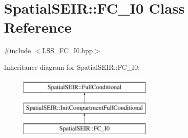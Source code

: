 \hypertarget{classSpatialSEIR_1_1FC__I0}{\section{Spatial\-S\-E\-I\-R\-:\-:F\-C\-\_\-\-I0 Class Reference}
\label{classSpatialSEIR_1_1FC__I0}
}


{\ttfamily \#include $<$L\-S\-S\-\_\-\-F\-C\-\_\-\-I0.\-hpp$>$}

Inheritance diagram for Spatial\-S\-E\-I\-R\-:\-:F\-C\-\_\-\-I0\-:\begin{figure}[H]
\begin{center}
\leavevmode
\includegraphics[height=3.000000cm]{classSpatialSEIR_1_1FC__I0}
\end{center}
\end{figure}
